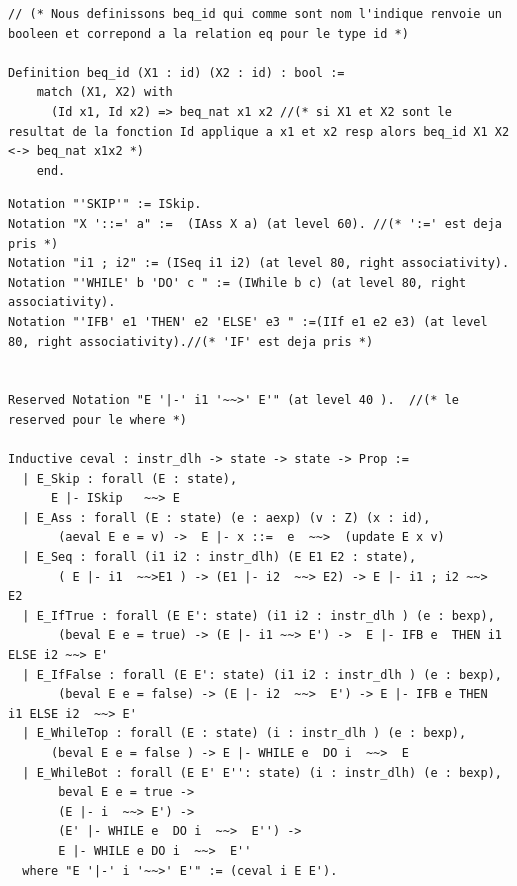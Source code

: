 \documentclass{article}
\begin{document}
\begin{appendices}



\begin{lstlisting}[style=CStyle]
// (* Nous definissons beq_id qui comme sont nom l'indique renvoie un booleen et correpond a la relation eq pour le type id *)

Definition beq_id (X1 : id) (X2 : id) : bool :=
    match (X1, X2) with
      (Id x1, Id x2) => beq_nat x1 x2 //(* si X1 et X2 sont le resultat de la fonction Id applique a x1 et x2 resp alors beq_id X1 X2 <-> beq_nat x1x2 *)
    end.
\end{lstlisting}

\begin{lstlisting}[style=CStyle]
Notation "'SKIP'" := ISkip.
Notation "X '::=' a" :=  (IAss X a) (at level 60). //(* ':=' est deja pris *)
Notation "i1 ; i2" := (ISeq i1 i2) (at level 80, right associativity).
Notation "'WHILE' b 'DO' c " := (IWhile b c) (at level 80, right associativity).
Notation "'IFB' e1 'THEN' e2 'ELSE' e3 " :=(IIf e1 e2 e3) (at level 80, right associativity).//(* 'IF' est deja pris *)


Reserved Notation "E '|-' i1 '~~>' E'" (at level 40 ).  //(* le reserved pour le where *)

Inductive ceval : instr_dlh -> state -> state -> Prop :=
  | E_Skip : forall (E : state),
      E |- ISkip   ~~> E
  | E_Ass : forall (E : state) (e : aexp) (v : Z) (x : id),
       (aeval E e = v) ->  E |- x ::=  e  ~~>  (update E x v)
  | E_Seq : forall (i1 i2 : instr_dlh) (E E1 E2 : state),
       ( E |- i1  ~~>E1 ) -> (E1 |- i2  ~~> E2) -> E |- i1 ; i2 ~~>  E2
  | E_IfTrue : forall (E E': state) (i1 i2 : instr_dlh ) (e : bexp),
       (beval E e = true) -> (E |- i1 ~~> E') ->  E |- IFB e  THEN i1 ELSE i2 ~~> E'
  | E_IfFalse : forall (E E': state) (i1 i2 : instr_dlh ) (e : bexp),
       (beval E e = false) -> (E |- i2  ~~>  E') -> E |- IFB e THEN  i1 ELSE i2  ~~> E'
  | E_WhileTop : forall (E : state) (i : instr_dlh ) (e : bexp),
      (beval E e = false ) -> E |- WHILE e  DO i  ~~>  E
  | E_WhileBot : forall (E E' E'': state) (i : instr_dlh) (e : bexp),
       beval E e = true -> 
       (E |- i  ~~> E') ->
       (E' |- WHILE e  DO i  ~~>  E'') -> 
       E |- WHILE e DO i  ~~>  E''
  where "E '|-' i '~~>' E'" := (ceval i E E').
  
\end{lstlisting}  
\end{appendices}
\end{document}
